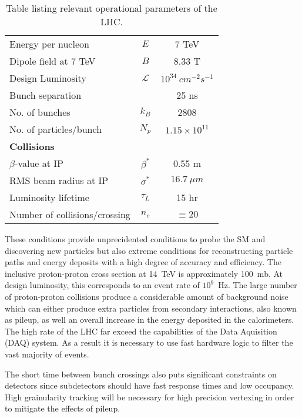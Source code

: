 \begin{table}
\begin{center}
\begin{tabular}{l|c|c}
\hline 
\hline
Energy per nucleon           & $E$           & 7 TeV    \\
Dipole field at 7 TeV        & $B$           & 8.33 T   \\
Design Luminosity            & $\mathscr{L}$ & $10^{34}~cm^{-2}s^{-1}$\\
Bunch separation             &               & 25 ns    \\
No. of bunches               & $k_B$         & 2808      \\
No. of particles/bunch       & $N_p$         & $1.15\times 10^{11}$\\ \hline
\multicolumn{3}{l}{{\bf Collisions}} \\ \hline
$\beta$-value at IP          & $\beta^*$     & 0.55 m   \\
RMS beam radius at IP        & $\sigma^*$    & $16.7~\mu m$  \\
Luminosity lifetime          & $\tau_L$      & 15 hr         \\
Number of collisions/crossing& $n_c$         & $\equiv20$      \\
\hline 
\hline
\end{tabular}
\caption{Table listing relevant operational parameters of the LHC.}
\label{table:LHCparameters}
\end{center}
\end{table}

These conditions provide unprecidented conditions to probe the SM and 
discovering new particles but also extreme conditions for reconstructing
particle paths and energy deposits with a high degree of accuracy and efficiency.
The inclusive proton-proton
cross section at 14~TeV is approximately 100~mb.  At design luminosity, this
corresponds to an event rate of $10^9$~Hz.  
The large number of proton-proton
collisions produce a considerable amount of background noise which can 
either produce extra particles from secondary interactions, also known as pileup, as well an overall
increase in the energy deposited in the calorimeters.  The  high rate of the 
LHC far exceed the capabilities of the Data Aquisition (DAQ) system.  As a 
result it is necessary to use fast hardware logic to filter the vast majority of 
events. 

The short time between bunch crossings also puts significant constraints on 
detectors since subdetectors should have fast response times and low occupancy. 
High grainularity tracking will be necessary for high precision vertexing in
order to mitigate the effects of pileup.

